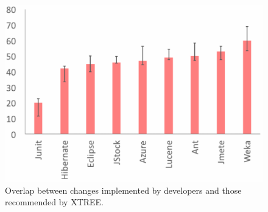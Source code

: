\begin{figure}[t]
\centering
\includegraphics[width=\linewidth]{rq1.png}
\caption{Overlap between changes implemented by developers and those 
recommended by XTREE.}
\label{fig:rq1}
\end{figure}